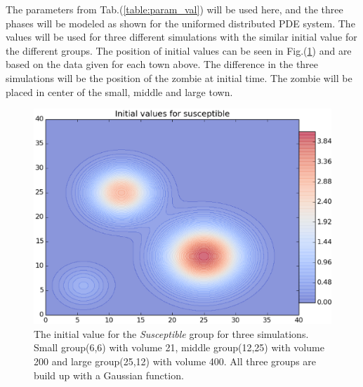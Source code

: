 \documentclass[%
twoside,                 %
final,                   %
10pt]{article}
\begin{document}
\noindent


\vspace{3mm}




\vspace{3mm}


The parameters from Tab.(\ref{table:param_val}) will be used here, and the three phases will be modeled as shown for the uniformed distributed PDE system. The values will be used for three different simulations with the similar initial value for the different groups. The position of initial values can be seen in Fig.(\ref{fig:initial_value_susceptible}) and are based on the data given for each town above. The difference in the three simulations will be the position of the zombie at initial time. The zombie will be placed in center of the small, middle and large town.


\begin{figure}[ht]
  \centerline{\includegraphics[width=0.8\linewidth]{plots/initial_value_susceptible.eps}}
  \caption{
  \label{fig:initial_value_susceptible} The initial value for the \emph{Susceptible} group for three simulations. Small group(6,6) with volume 21, middle group(12,25) with volume 200 and large group(25,12) with volume 400. All three groups are build up with a Gaussian function.
  }
\end{figure}




\vspace{3mm}




\vspace{3mm}
\end{document}
